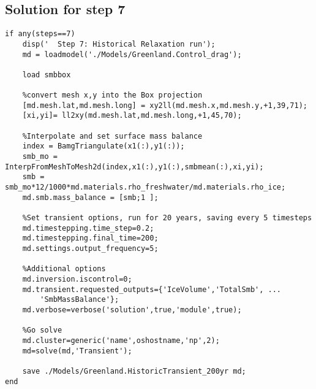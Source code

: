 \subsection{Solution for step 7} %
\begin{verbatim}if any(steps==7)
	disp('  Step 7: Historical Relaxation run');
	md = loadmodel('./Models/Greenland.Control_drag');

	load smbbox

	%convert mesh x,y into the Box projection
	[md.mesh.lat,md.mesh.long] = xy2ll(md.mesh.x,md.mesh.y,+1,39,71);
	[xi,yi]= ll2xy(md.mesh.lat,md.mesh.long,+1,45,70);

	%Interpolate and set surface mass balance
	index = BamgTriangulate(x1(:),y1(:));
	smb_mo = InterpFromMeshToMesh2d(index,x1(:),y1(:),smbmean(:),xi,yi);
	smb = smb_mo*12/1000*md.materials.rho_freshwater/md.materials.rho_ice;
	md.smb.mass_balance = [smb;1 ];

	%Set transient options, run for 20 years, saving every 5 timesteps
	md.timestepping.time_step=0.2;
	md.timestepping.final_time=200;
	md.settings.output_frequency=5;

	%Additional options
	md.inversion.iscontrol=0;
	md.transient.requested_outputs={'IceVolume','TotalSmb', ...
		'SmbMassBalance'};
	md.verbose=verbose('solution',true,'module',true);

	%Go solve
	md.cluster=generic('name',oshostname,'np',2);
	md=solve(md,'Transient');
	
	save ./Models/Greenland.HistoricTransient_200yr md;
end\end{verbatim}

